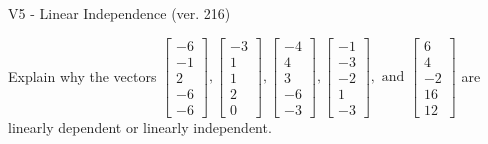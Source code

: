 \begin{exercise}
  \begin{exerciseTitle}V5 - Linear Independence (ver. 216)\end{exerciseTitle}
  \begin{exerciseStatement}
    Explain why the vectors \(\left[\begin{array}{r}
-6 \\
-1 \\
2 \\
-6 \\
-6
\end{array}\right] , \left[\begin{array}{r}
-3 \\
1 \\
1 \\
2 \\
0
\end{array}\right] , \left[\begin{array}{r}
-4 \\
4 \\
3 \\
-6 \\
-3
\end{array}\right] , \left[\begin{array}{r}
-1 \\
-3 \\
-2 \\
1 \\
-3
\end{array}\right] , \text{ and } \left[\begin{array}{r}
6 \\
4 \\
-2 \\
16 \\
12
\end{array}\right]\) are linearly dependent or linearly independent.	



\end{exerciseStatement}
\end{exercise}
